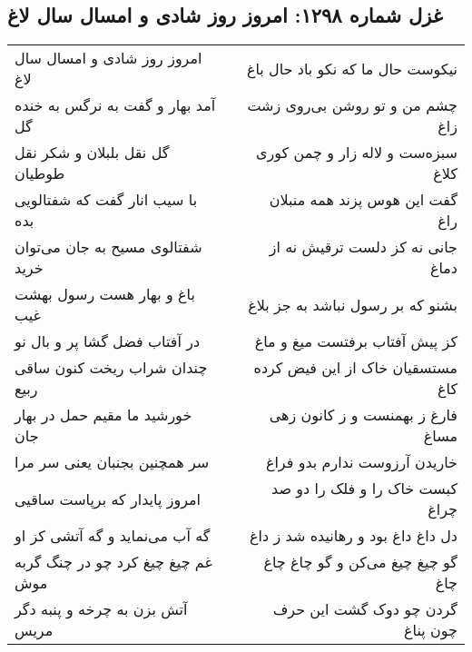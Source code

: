 \begin{center}
\section*{غزل شماره ۱۲۹۸: امروز روز شادی و امسال سال لاغ}
\label{sec:1298}
\begin{longtable}{l p{0.5cm} r}
امروز روز شادی و امسال سال لاغ
&&
نیکوست حال ما که نکو باد حال باغ
\\
آمد بهار و گفت به نرگس به خنده گل
&&
چشم من و تو روشن بی‌روی زشت زاغ
\\
گل نقل بلبلان و شکر نقل طوطیان
&&
سبزه‌ست و لاله زار و چمن کوری کلاغ
\\
با سیب انار گفت که شفتالویی بده
&&
گفت این هوس پزند همه منبلان راغ
\\
شفتالوی مسیح به جان می‌توان خرید
&&
جانی نه کز دلست ترقیش نه از دماغ
\\
باغ و بهار هست رسول بهشت غیب
&&
بشنو که بر رسول نباشد به جز بلاغ
\\
در آفتاب فضل گشا پر و بال نو
&&
کز پیش آفتاب برفتست میغ و ماغ
\\
چندان شراب ریخت کنون ساقی ربیع
&&
مستسقیان خاک از این فیض کرده کاغ
\\
خورشید ما مقیم حمل در بهار جان
&&
فارغ ز بهمنست و ز کانون زهی مساغ
\\
سر همچنین بجنبان یعنی سر مرا
&&
خاریدن آرزوست ندارم بدو فراغ
\\
امروز پایدار که برپاست ساقیی
&&
کبست خاک را و فلک را دو صد چراغ
\\
گه آب می‌نماید و گه آتشی کز او
&&
دل داغ داغ بود و رهانیده شد ز داغ
\\
غم چیغ چیغ کرد چو در چنگ گربه موش
&&
گو چیغ چیغ می‌کن و گو چاغ چاغ چاغ
\\
آتش بزن به چرخه و پنبه دگر مریس
&&
گردن چو دوک گشت این حرف چون پناغ
\\
\end{longtable}
\end{center}
